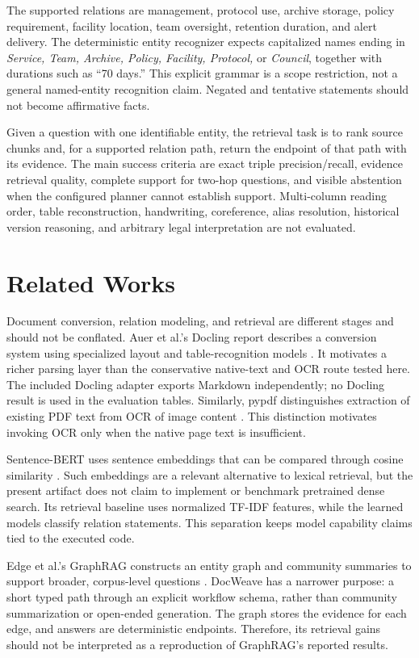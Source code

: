 \documentclass[conference]{IEEEtran}
\begin{document}
The supported relations are management, protocol use, archive storage, policy requirement, facility location, team oversight, retention duration, and alert delivery. The deterministic entity recognizer expects capitalized names ending in \emph{Service, Team, Archive, Policy, Facility, Protocol,} or \emph{Council}, together with durations such as ``70 days.'' This explicit grammar is a scope restriction, not a general named-entity recognition claim. Negated and tentative statements should not become affirmative facts.

Given a question with one identifiable entity, the retrieval task is to rank source chunks and, for a supported relation path, return the endpoint of that path with its evidence. The main success criteria are exact triple precision/recall, evidence retrieval quality, complete support for two-hop questions, and visible abstention when the configured planner cannot establish support. Multi-column reading order, table reconstruction, handwriting, coreference, alias resolution, historical version reasoning, and arbitrary legal interpretation are not evaluated.

\section{Related Works}
Document conversion, relation modeling, and retrieval are different stages and should not be conflated. Auer et al.'s Docling report describes a conversion system using specialized layout and table-recognition models \cite{docling}. It motivates a richer parsing layer than the conservative native-text and OCR route tested here. The included Docling adapter exports Markdown independently; no Docling result is used in the evaluation tables. Similarly, pypdf distinguishes extraction of existing PDF text from OCR of image content \cite{pypdf}. This distinction motivates invoking OCR only when the native page text is insufficient.

Sentence-BERT uses sentence embeddings that can be compared through cosine similarity \cite{sbert}. Such embeddings are a relevant alternative to lexical retrieval, but the present artifact does not claim to implement or benchmark pretrained dense search. Its retrieval baseline uses normalized TF-IDF features, while the learned models classify relation statements. This separation keeps model capability claims tied to the executed code.

Edge et al.'s GraphRAG constructs an entity graph and community summaries to support broader, corpus-level questions \cite{graphrag}. DocWeave has a narrower purpose: a short typed path through an explicit workflow schema, rather than community summarization or open-ended generation. The graph stores the evidence for each edge, and answers are deterministic endpoints. Therefore, its retrieval gains should not be interpreted as a reproduction of GraphRAG's reported results.
\end{document}
